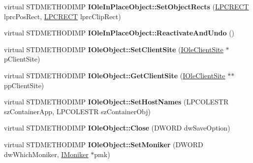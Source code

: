 \begin{DoxyCompactItemize}
\item 
\mbox{\label{class_s_e_a_l_e_d___a6ff59f24eb55ba8c02435c5c70b12c3c}} 
virtual S\+T\+D\+M\+E\+T\+H\+O\+D\+I\+MP {\bfseries I\+Ole\+In\+Place\+Object\+::\+Set\+Object\+Rects} (\hyperlink{structtag_r_e_c_t}{L\+P\+C\+R\+E\+CT} lprc\+Pos\+Rect, \hyperlink{structtag_r_e_c_t}{L\+P\+C\+R\+E\+CT} lprc\+Clip\+Rect)
\item 
\mbox{\label{class_s_e_a_l_e_d___aeae64184bb6af2bdff174ac785188e0b}} 
virtual S\+T\+D\+M\+E\+T\+H\+O\+D\+I\+MP {\bfseries I\+Ole\+In\+Place\+Object\+::\+Reactivate\+And\+Undo} ()
\item 
\mbox{\label{class_s_e_a_l_e_d___ab3b9845c4a2c0596789e6a24ed9be3dd}} 
virtual S\+T\+D\+M\+E\+T\+H\+O\+D\+I\+MP {\bfseries I\+Ole\+Object\+::\+Set\+Client\+Site} (\hyperlink{interface_i_ole_client_site}{I\+Ole\+Client\+Site} $\ast$p\+Client\+Site)
\item 
\mbox{\label{class_s_e_a_l_e_d___a9f7ba3b5f639109a229c50b8cff53e8a}} 
virtual S\+T\+D\+M\+E\+T\+H\+O\+D\+I\+MP {\bfseries I\+Ole\+Object\+::\+Get\+Client\+Site} (\hyperlink{interface_i_ole_client_site}{I\+Ole\+Client\+Site} $\ast$$\ast$pp\+Client\+Site)
\item 
\mbox{\label{class_s_e_a_l_e_d___a9481c6dcec2cfeec71b876c2649556e5}} 
virtual S\+T\+D\+M\+E\+T\+H\+O\+D\+I\+MP {\bfseries I\+Ole\+Object\+::\+Set\+Host\+Names} (L\+P\+C\+O\+L\+E\+S\+TR sz\+Container\+App, L\+P\+C\+O\+L\+E\+S\+TR sz\+Container\+Obj)
\item 
\mbox{\label{class_s_e_a_l_e_d___a09741420ebe44b709ee0dfcc02b757bb}} 
virtual S\+T\+D\+M\+E\+T\+H\+O\+D\+I\+MP {\bfseries I\+Ole\+Object\+::\+Close} (D\+W\+O\+RD dw\+Save\+Option)
\item 
\mbox{\label{class_s_e_a_l_e_d___a67d2259385706dfc2c38e89f7a05313b}} 
virtual S\+T\+D\+M\+E\+T\+H\+O\+D\+I\+MP {\bfseries I\+Ole\+Object\+::\+Set\+Moniker} (D\+W\+O\+RD dw\+Which\+Moniker, \hyperlink{interface_i_moniker}{I\+Moniker} $\ast$pmk)
\item 
\mbox{\label{class_s_e_a_l_e_d___aaab71ea716f112306829d122c4a116f6}} 
$$
\end{DoxyCompactItemize}

